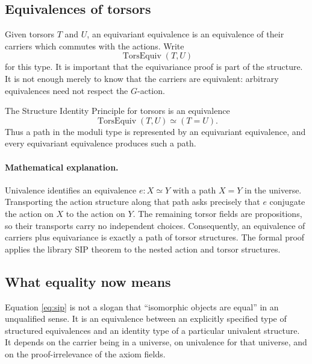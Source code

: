 \subsection{Equivalences of torsors}
Given torsors $T$ and $U$, an equivariant equivalence is an equivalence of their carriers which commutes with the actions. Write
\begin{equation}
\operatorname{TorsEquiv}(T,U)
\end{equation}
for this type. It is important that the equivariance proof is part of the structure. It is not enough merely to know that the carriers are equivalent: arbitrary equivalences need not respect the $G$-action.

\begin{definition}
The Structure Identity Principle for torsors is an equivalence
\begin{equation}
\operatorname{TorsEquiv}(T,U) \simeq (T=U).
\label{eq:sip}
\end{equation}
Thus a path in the moduli type is represented by an equivariant equivalence, and every equivariant equivalence produces such a path.
\end{definition}

\paragraph{Mathematical explanation.}
Univalence identifies an equivalence $e:X\simeq Y$ with a path $X=Y$ in the universe. Transporting the action structure along that path asks precisely that $e$ conjugate the action on $X$ to the action on $Y$. The remaining torsor fields are propositions, so their transports carry no independent choices. Consequently, an equivalence of carriers plus equivariance is exactly a path of torsor structures. The formal proof applies the library SIP theorem to the nested action and torsor structures.


\subsection{What equality now means}
Equation \eqref{eq:sip} is not a slogan that ``isomorphic objects are equal'' in an unqualified sense. It is an equivalence between an explicitly specified type of structured equivalences and an identity type of a particular univalent structure. It depends on the carrier being in a universe, on univalence for that universe, and on the proof-irrelevance of the axiom fields.

